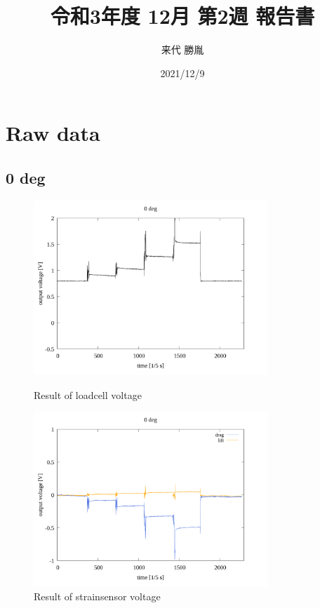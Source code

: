 \documentclass[twocolumn,a4j]{jsarticle}
\author{来代 勝胤}
\title{令和3年度 12月 第2週 報告書}
\date{2021/12/9}
\begin{document}
\columnseprule=0.1mm

\maketitle
\section{Raw data}
\subsection{0 deg}
\begin{figure}[htbp]
    \footnotesize
    \begin{center}
        \includegraphics[width=88mm]{../images/voltage-time/0_loadcell.png}
        \caption{Result of loadcell voltage}
        \includegraphics[width=88mm]{../images/voltage-time/0_strainsensor.png}
        \caption{Result of strainsensor voltage}
    \end{center}
\end{figure}

\newpage
\end{document}
